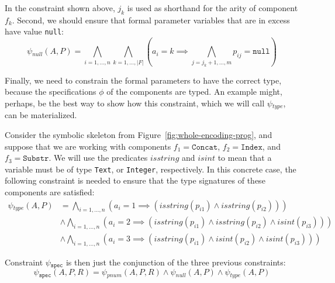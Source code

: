 \noindent
In the constraint shown above, $j_k$ is used as shorthand for the arity of
component $f_k$.
Second, we should ensure that formal parameter variables that are in excess
have value \lstinline{null}:
%
\[
  \psi{}_{null}(A, P) =
  \bigwedge_{i=1,\ldots,n} \bigwedge_{k=1,\ldots,|F|}
  (a_i = k \implies \bigwedge_{j=j_k+1,\ldots,m} p_{ij} = \mathtt{null})
\]

\noindent
Finally, we need to constrain the formal parameters to have the correct type,
because the specifications $\phi{}$ of the components are typed.
An example might, perhaps, be the best way to show how this constraint, which we
will call $\psi{}_{type}$, can be materialized.

\begin{example}
  Consider the symbolic skeleton from Figure~\ref{fig:whole-encoding-prog}, and
  suppose that we are working with components
  $f_1 = \mathtt{Concat}$, $f_2 = \mathtt{Index}$, and $f_3 = \mathtt{Substr}$.
  We will use the predicates $isstring$ and $isint$ to mean that a variable must
  be of type \lstinline{Text}, or \lstinline{Integer}, respectively.
  In this concrete case, the following constraint is needed to ensure that the
  type signatures of these components are satisfied:
  \begin{align*}
    \psi{}_{type}(A, P)
    &= \bigwedge_{i=1,\ldots,n}
      (a_i = 1 \implies (isstring(p_{i1}) \wedge isstring(p_{i2}))) \\
    &\wedge \bigwedge_{i=1,\ldots,n}
      (a_i = 2 \implies (isstring(p_{i1}) \wedge isstring(p_{i2}) \wedge isint(p_{i3}))) \\
    &\wedge \bigwedge_{i=1,\ldots,n}
      (a_i = 3 \implies (isstring(p_{i1}) \wedge isint(p_{i2}) \wedge isint(p_{i3})))
  \end{align*}
\end{example}

\noindent
Constraint $\psi{}_{\mathtt{spec}}$ is then just the conjunction of the three
previous constraints:
%
\[
  \psi{}_{\mathtt{spec}}(A, P, R) =
  \psi{}_{pnum}(A, P, R) \wedge \psi{}_{null}(A, P) \wedge \psi{}_{type}(A, P)
\]


